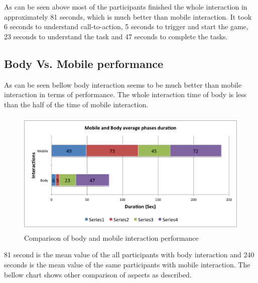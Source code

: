 As can be seen above most of the participants finished the whole interaction in approximately 81 seconds, which is much better than mobile interaction. It took 6 seconds to understand call-to-action, 5 seconds to trigger and start the game, 23 seconds to understand the task and 47 seconds to complete the tasks.




\subsection{Body Vs. Mobile performance}
As can be seen bellow body interaction seems to be much better than mobile interaction in terms of performance. The whole interaction time of body is less than the half of the time of mobile interaction. 

\begin{figure}[H]
\centering
\includegraphics[width=12cm,height=6cm]{Figures/6/mobile_body_performance}%
 \caption{Comparison of body and mobile interaction performance }%
 \label{fig:mobile_body_performance}%
\end{figure}

81 second is the mean value of the all participants with body interaction and 240 seconds is the mean value of the same participants with mobile interaction. The bellow chart shows other comparison of aspects as described.

